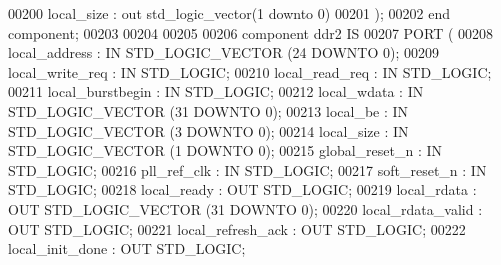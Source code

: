 \begin{DoxyCode}
00200         local_size          : \textcolor{keywordflow}{out} \textcolor{comment}{std\_logic\_vector}(\textcolor{vhdllogic}{}\textcolor{vhdllogic}{1} \textcolor{keywordflow}{downto} \textcolor{vhdllogic}{}\textcolor{vhdllogic}{0})  
00201         );
00202 \textcolor{keywordflow}{end} \textcolor{keywordflow}{component};
00203 
00204 
00205 
00206 \textcolor{keywordflow}{component} ddr2 \textcolor{keywordflow}{IS}
00207     \textcolor{keywordflow}{PORT} (
00208         local_address       : \textcolor{keywordflow}{IN} \textcolor{comment}{STD\_LOGIC\_VECTOR} (\textcolor{vhdllogic}{}\textcolor{vhdllogic}{24} \textcolor{keywordflow}{DOWNTO} \textcolor{vhdllogic}{}\textcolor{vhdllogic}{0});
00209         local_write_req : \textcolor{keywordflow}{IN} \textcolor{comment}{STD\_LOGIC};
00210         local_read_req      : \textcolor{keywordflow}{IN} \textcolor{comment}{STD\_LOGIC};
00211         local_burstbegin    : \textcolor{keywordflow}{IN} \textcolor{comment}{STD\_LOGIC};
00212         local_wdata         : \textcolor{keywordflow}{IN} \textcolor{comment}{STD\_LOGIC\_VECTOR} (\textcolor{vhdllogic}{}\textcolor{vhdllogic}{31} \textcolor{keywordflow}{DOWNTO} \textcolor{vhdllogic}{}\textcolor{vhdllogic}{0});
00213         local_be                : \textcolor{keywordflow}{IN} \textcolor{comment}{STD\_LOGIC\_VECTOR} (\textcolor{vhdllogic}{}\textcolor{vhdllogic}{3} \textcolor{keywordflow}{DOWNTO} \textcolor{vhdllogic}{}\textcolor{vhdllogic}{0});
00214         local_size          : \textcolor{keywordflow}{IN} \textcolor{comment}{STD\_LOGIC\_VECTOR} (\textcolor{vhdllogic}{}\textcolor{vhdllogic}{1} \textcolor{keywordflow}{DOWNTO} \textcolor{vhdllogic}{}\textcolor{vhdllogic}{0});
00215         global_reset_n      : \textcolor{keywordflow}{IN} \textcolor{comment}{STD\_LOGIC};
00216         pll_ref_clk         : \textcolor{keywordflow}{IN} \textcolor{comment}{STD\_LOGIC};
00217         soft_reset_n        : \textcolor{keywordflow}{IN} \textcolor{comment}{STD\_LOGIC};
00218         local_ready         : \textcolor{keywordflow}{OUT} \textcolor{comment}{STD\_LOGIC};
00219         local_rdata         : \textcolor{keywordflow}{OUT} \textcolor{comment}{STD\_LOGIC\_VECTOR} (\textcolor{vhdllogic}{}\textcolor{vhdllogic}{31} \textcolor{keywordflow}{DOWNTO} \textcolor{vhdllogic}{}\textcolor{vhdllogic}{0});
00220         local_rdata_valid   : \textcolor{keywordflow}{OUT} \textcolor{comment}{STD\_LOGIC};
00221         local_refresh_ack   : \textcolor{keywordflow}{OUT} \textcolor{comment}{STD\_LOGIC};
00222         local_init_done : \textcolor{keywordflow}{OUT} \textcolor{comment}{STD\_LOGIC};

\end{DoxyCode}

